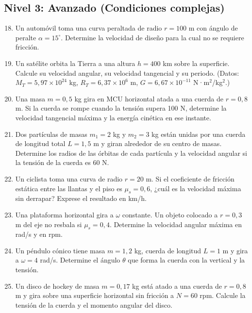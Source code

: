 \documentclass[12pt]{article}
\begin{document}
\subsection*{Nivel 3: Avanzado (Condiciones complejas)}
\begin{enumerate}
  \setcounter{enumi}{17}
  \item Un automóvil toma una curva peraltada de radio \(r = 100\) m con ángulo de peralte \(\alpha = 15^\circ\). Determine la velocidad de diseño para la cual no se requiere fricción.
  \item Un satélite orbita la Tierra a una altura \(h = 400\) km sobre la superficie. Calcule su velocidad angular, su velocidad tangencial y su periodo. (Datos: \(M_T = 5{,}97 \times 10^{24}\) kg, \(R_T = 6{,}37 \times 10^6\) m, \(G = 6{,}67 \times 10^{-11}\) N·m\(^2\)/kg\(^2\).)
  \item Una masa \(m = 0{,}5\) kg gira en MCU horizontal atada a una cuerda de \(r = 0{,}8\) m. Si la cuerda se rompe cuando la tensión supera 100 N, determine la velocidad tangencial máxima y la energía cinética en ese instante.
  \item Dos partículas de masas \(m_1 = 2\) kg y \(m_2 = 3\) kg están unidas por una cuerda de longitud total \(L = 1{,}5\) m y giran alrededor de su centro de masas. Determine los radios de las órbitas de cada partícula y la velocidad angular si la tensión de la cuerda es 60 N.
  \item Un ciclista toma una curva de radio \(r = 20\) m. Si el coeficiente de fricción estática entre las llantas y el piso es \(\mu_s = 0{,}6\), ¿cuál es la velocidad máxima sin derrapar? Exprese el resultado en km/h.
  \item Una plataforma horizontal gira a \(\omega\) constante. Un objeto colocado a \(r = 0{,}3\) m del eje no resbala si \(\mu_s = 0{,}4\). Determine la velocidad angular máxima en rad/s y en rpm.
  \item Un péndulo cónico tiene masa \(m = 1{,}2\) kg, cuerda de longitud \(L = 1\) m y gira a \(\omega = 4\) rad/s. Determine el ángulo \(\theta\) que forma la cuerda con la vertical y la tensión.
  \item Un disco de hockey de masa \(m = 0{,}17\) kg está atado a una cuerda de \(r = 0{,}8\) m y gira sobre una superficie horizontal sin fricción a \(N = 60\) rpm. Calcule la tensión de la cuerda y el momento angular del disco.
\end{enumerate}

\newpage

\end{document}
